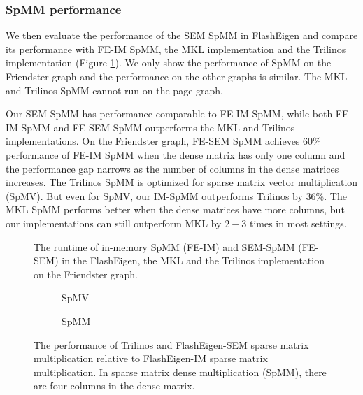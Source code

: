 \subsubsection{SpMM performance}

We then evaluate the performance of the SEM SpMM in FlashEigen and compare its
performance with FE-IM SpMM, the MKL implementation and the Trilinos
implementation (Figure \ref{perf:spmm}). We only show the performance of
SpMM on the Friendster graph and the performance on the other graphs is
similar. The MKL and Trilinos SpMM cannot run on the page graph.

Our SEM SpMM has performance comparable to FE-IM SpMM, while both FE-IM SpMM
and FE-SEM SpMM outperforms the MKL and Trilinos implementations.
On the Friendster graph, FE-SEM SpMM achieves 60\% performance of FE-IM SpMM
when the dense matrix has only one column and the performance gap narrows
as the number of columns in the dense matrices increases.
The Trilinos SpMM is optimized for sparse matrix vector multiplication (SpMV).
But even for SpMV, our IM-SpMM outperforms Trilinos by 36\%. The MKL SpMM
performs better when the dense matrices have more columns, but our
implementations can still outperform MKL by $2-3$ times in most settings.

\begin{figure}
	\begin{center}
		\footnotesize
		\vspace{-15pt}
		
		\vspace{-15pt}
		\caption{The runtime of in-memory SpMM (FE-IM) and SEM-SpMM (FE-SEM)
			in the FlashEigen, the MKL and the Trilinos implementation on
		the Friendster graph.}
		\label{perf:spmm}
	\end{center}
\end{figure}

\begin{figure}[t]
\centering
\footnotesize
\vspace{-15pt}
\begin{subfigure}{.5\linewidth}
	
	\vspace{-15pt}
	\caption{SpMV}
	\label{fig:spmm1}
\end{subfigure}%
\begin{subfigure}{.5\linewidth}
	
	\vspace{-15pt}
	\caption{SpMM}
	\label{fig:spmm4}
\end{subfigure}
\caption{The performance of Trilinos and FlashEigen-SEM sparse matrix
multiplication relative to FlashEigen-IM sparse matrix multiplication.
In sparse matrix dense multiplication (SpMM), there are four columns
in the dense matrix.}
\vspace{-15pt}
\label{fig:spmm}
\end{figure}

